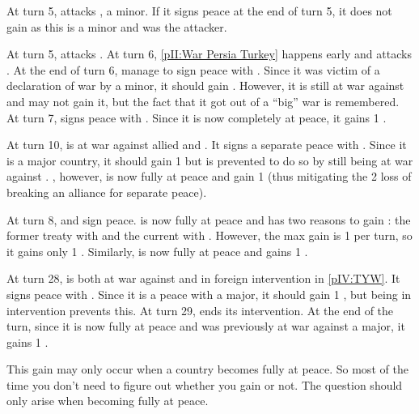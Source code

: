 \begin{exemple}
  At turn 5, \TUR attacks \paysDamas, a minor. If it signs peace at the end of
  turn 5, it does not gain \STAB as this is a minor and \TUR was the
  attacker.

  At turn 5, \TUR attacks \paysDamas. At turn 6, \ref{pII:War Persia Turkey}
  happens early and \paysPerse attacks \TUR. At the end of turn 6, \TUR manage
  to sign peace with \paysPerse. Since it was victim of a declaration of war
  by a minor, it should gain \STAB. However, it is still at war against
  \paysDamas and may not gain it, but the fact that it got out of a ``big''
  war is remembered. At turn 7, \TUR signs peace with \paysDamas. Since it is
  now completely at peace, it gains 1 \STAB.
\end{exemple}

\begin{exemple}
  At turn 10, \TUR is at war against allied \HIS and \VEN. It signs a separate
  peace with \VEN. Since it is a major country, it should gain 1 \STAB but is
  prevented to do so by still being at war against \HIS. \VEN, however, is now
  fully at peace and gain 1 \STAB (thus mitigating the 2 \STAB loss of
  breaking an alliance for separate peace).

  At turn 8, \TUR and \HIS sign peace. \TUR is now fully at peace and has two
  reasons to gain \STAB: the former treaty with \VEN and the current with
  \HIS. However, the max gain is 1 per turn, so it gains only 1
  \STAB. Similarly, \HIS is now fully at peace and gains 1 \STAB.
\end{exemple}

\begin{exemple}
  At turn 28, \POL is both at war against \RUS and in foreign intervention in
  \ref{pIV:TYW}. It signs peace with \RUS. Since it is a peace with a major,
  it should gain 1 \STAB, but being in intervention prevents this. At turn 29,
  \POL ends its intervention. At the end of the turn, since it is now fully at
  peace and was previously at war against a major, it gains 1 \STAB.
\end{exemple}

\begin{playtip}
  This \STAB gain may only occur when a country becomes fully at peace. So
  most of the time you don't need to figure out whether you gain \STAB or
  not. The question should only arise when becoming fully at peace.
\end{playtip}

